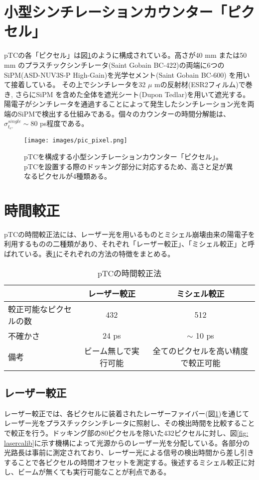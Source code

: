 \documentclass[Yonemoto_master.tex]{subfiles}
\begin{document}
\section{小型シンチレーションカウンター「ピクセル」}
pTCの各「ピクセル」は図\ref{fig: pic_pixel}のように構成されている。高さが40 mm または50 mm のプラスチックシンチレータ(Saint Gobain BC-422)の両端に6つのSiPM(ASD-NUV3S-P High-Gain)を光学セメント(Saint Gobain BC-600) を用いて接着している。 その上でシンチレータを32 $\mu$ mの反射材(ESR2フィルム)で巻き, さらにSiPM を含めた全体を遮光シート(Dupon Tedlar)を用いて遮光する。陽電子がシンチレータを通過することによって発生したシンチレーション光を両端のSiPMで検出する仕組みである。個々のカウンターの時間分解能は、$\sigma_{t_{e^+}}^{single} \sim 80$ ps程度である。
\begin{figure}[h]
\begin{center}
\texttt{[image: images/pic\_pixel.png]}
\caption{pTCを構成する小型シンチレーションカウンター「ピクセル」。pTCを設置する際のドッキング部分に対応するため、高さと足が異なるピクセルが4種類ある。}
\label{fig: pic_pixel}
\end{center}
\end{figure}


\section{時間較正}
pTCの時間較正法には、レーザー光を用いるものとミシェル崩壊由来の陽電子を利用するものの二種類があり、それぞれ「レーザー較正」、「ミシェル較正」と呼ばれている。表\ref{tab: ptc_timecalib}にそれぞれの方法の特徴をまとめる。

\begin{table}[h]
 \centering
 \caption{pTCの時間較正法}
 \label{tab: ptc_timecalib}
  \begin{tabular}{lcc}
   \hline
    & レーザー較正 & ミシェル較正 \\
   \hline
   較正可能なピクセルの数 & 432 & 512 \\
   不確かさ & 24 ps \cite{nakao} & $\sim$ 10 ps \\
   備考 & ビーム無しで実行可能 & 全てのピクセルを高い精度で較正可能 \\
   \hline
  \end{tabular}
\end{table}

\subsection{レーザー較正}
レーザー較正では、各ピクセルに装着されたレーザーファイバー(図\ref{fig: pic_pixel})を通じてレーザー光をプラスチックシンチレータに照射し、その検出時間を比較することで較正を行う。ドッキング部の80ピクセルを除いた432ピクセルに対し、図\ref{fig: lasercalib}に示す機構によって光源からのレーザー光を分配している。各部分の光路長は事前に測定されており、レーザー光による信号の検出時間から差し引きすることで各ピクセルの時間オフセットを測定する。後述するミシェル較正に対し、ビームが無くても実行可能なことが利点である。
\end{document}
